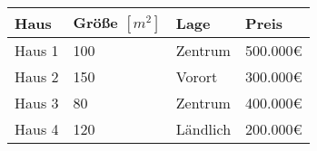 \begin{tabularx}{\textwidth}{|X|X|X|X|}
    \hline
    \textbf{Haus} & \textbf{Größe $[m^2]$} & \textbf{Lage} & \textbf{Preis} \\
    \hline
    Haus 1        & 100                    & Zentrum       & 500.000€       \\
    \hline
    Haus 2        & 150                    & Vorort        & 300.000€       \\
    \hline
    Haus 3        & 80                     & Zentrum       & 400.000€       \\
    \hline
    Haus 4        & 120                    & Ländlich      & 200.000€       \\
    \hline
\end{tabularx}